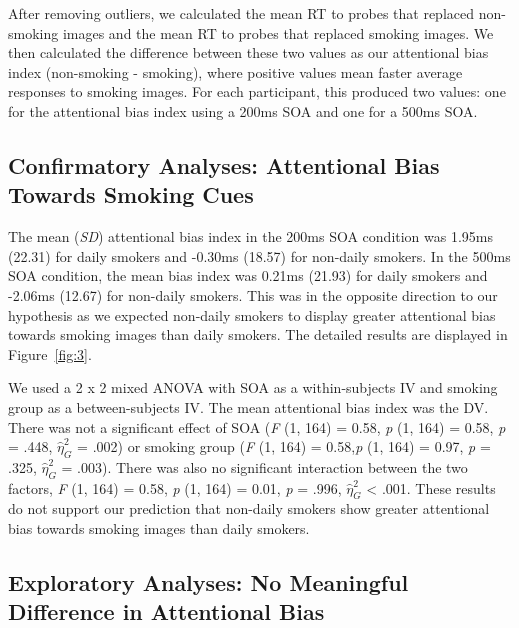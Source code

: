 \documentclass[empirical, authordate, issue]{jote-new-article}
\begin{document}
After removing outliers, we calculated the mean RT to probes that replaced non-smoking images and the mean RT to probes that replaced smoking images. We then calculated the difference between these two values as our attentional bias index (non-smoking - smoking), where positive values mean faster average responses to smoking images. For each participant, this produced two values: one for the attentional bias index using a 200ms SOA and one for a 500ms SOA.
\subsection{Confirmatory Analyses: Attentional Bias Towards Smoking Cues}

The mean (\emph{SD}) attentional bias index in the 200ms SOA condition was 1.95ms (22.31) for daily smokers and -0.30ms (18.57) for non-daily smokers. In the 500ms SOA condition, the mean bias index was 0.21ms (21.93) for daily smokers and -2.06ms (12.67) for non-daily smokers. This was in the opposite direction to our hypothesis as we expected non-daily smokers to display greater attentional bias towards smoking images than daily smokers. The detailed results are displayed in Figure~\ref{fig:3}.

We used a 2 x 2 mixed ANOVA with SOA as a within-subjects IV and smoking group as a between-subjects IV. The mean attentional bias index was the DV. There was not a significant effect of SOA (\emph{F} (1, 164) = 0.58, \emph{p} (1, 164) = 0.58, \emph{p} = .448, $\hat{\eta}_{G}^{2}$ = .002) or smoking group (\emph{F} (1, 164) = 0.58,\emph{p} (1, 164) = 0.97, \emph{p} = .325, $\hat{\eta}_{G}^{2}$ = .003). There was also no significant interaction between the two factors, \emph{F} (1, 164) = 0.58, \emph{p} (1, 164) = 0.01, \emph{p} = .996, $\hat{\eta}_{G}^{2}$ < .001. These results do not support our prediction that non-daily smokers show greater attentional bias towards smoking images than daily smokers.


























\subsection{Exploratory Analyses: No Meaningful Difference in Attentional Bias}
\end{document}
